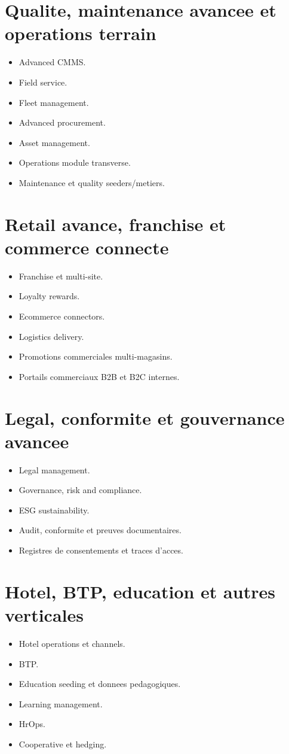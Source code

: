 \documentclass[11pt,a4paper]{article}
\begin{document}
\section{Qualite, maintenance avancee et operations terrain}
\begin{itemize}[leftmargin=1.2cm]
    \item Advanced CMMS.
    \item Field service.
    \item Fleet management.
    \item Advanced procurement.
    \item Asset management.
    \item Operations module transverse.
    \item Maintenance et quality seeders/metiers.
\end{itemize}

\section{Retail avance, franchise et commerce connecte}
\begin{itemize}[leftmargin=1.2cm]
    \item Franchise et multi-site.
    \item Loyalty rewards.
    \item Ecommerce connectors.
    \item Logistics delivery.
    \item Promotions commerciales multi-magasins.
    \item Portails commerciaux B2B et B2C internes.
\end{itemize}

\section{Legal, conformite et gouvernance avancee}
\begin{itemize}[leftmargin=1.2cm]
    \item Legal management.
    \item Governance, risk and compliance.
    \item ESG sustainability.
    \item Audit, conformite et preuves documentaires.
    \item Registres de consentements et traces d'acces.
\end{itemize}

\section{Hotel, BTP, education et autres verticales}
\begin{itemize}[leftmargin=1.2cm]
    \item Hotel operations et channels.
    \item BTP.
    \item Education seeding et donnees pedagogiques.
    \item Learning management.
    \item HrOps.
    \item Cooperative et hedging.
\end{itemize}
\end{document}
